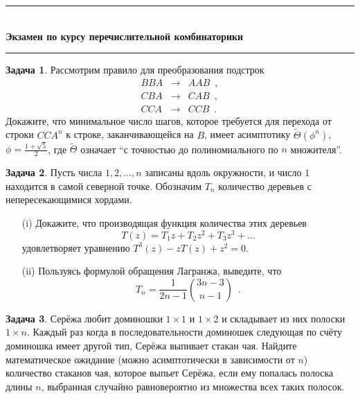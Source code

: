 \documentclass[a5paper]{article}
\def \topic {Экзамен по курсу перечислительной комбинаторики}
\theoremstyle{definition}
\newtheorem{problem}{Задача}
\newcommand{\HRule}{\rule{\linewidth}{0.5mm}}
\begin{document}
\begin{center}

\vspace{-2cm}
\HRule \\[0.2cm]
{ \Large \bfseries \topic} %
\HRule

\end{center}

\begin{center}
\end{center}

\begin{problem}
    Рассмотрим правило для преобразования подстрок
\begin{eqnarray*}
    BBA &\to& AAB \enspace , \\
    CBA &\to& CAB \enspace , \\
    CCA &\to& CCB \enspace . 
\end{eqnarray*}
Докажите, что минимальное число шагов, которое требуется для перехода от строки
\( CC A^{n} \) к строке, заканчивающейся на \( B \), имеет
асимптотику \( \widetilde\Theta(\phi^n) \), \( \phi = \frac{1 + \sqrt{5}}{2} \),
где \( \widetilde \Theta \) означает ``с точностью до полиномиального по \( n \)
множителя''.
\end{problem}

\begin{problem}
    Пусть числа \( 1, 2, \ldots, n \) записаны вдоль окружности,
и число \( 1 \) находится в самой северной точке.
Обозначим \( T_n \) количество деревьев с непересекающимися хордами.
\begin{enumerate}
\item[(i)] Докажите, что производящая функция количества этих деревьев
\begin{equation}
    T(z) = T_1 z + T_2 z^2 + T_3z^3 + \ldots
\end{equation}
удовлетворяет уравнению
\(
    T^3(z) - z T(z) + z^2 = 0
\).
\item[(ii)] Пользуясь формулой обращения Лагранжа, выведите, что
\begin{equation}
    T_n = \dfrac{1}{2n - 1} {3n - 3 \choose n-1}
    \enspace .
\end{equation}
\end{enumerate}
\end{problem}

\newpage
\begin{problem}
    Серёжа любит доминошки \( 1 \times 1 \) и \( 1 \times 2 \) и складывает
из них полоски \( 1 \times n \). Каждый раз когда в последовательности доминошек
следующая по счёту доминошка имеет другой тип, Серёжа выпивает стакан чая.
Найдите математическое ожидание (можно асимптотически в зависимости от \( n \))
количество стаканов чая, которое выпьет Серёжа, если ему попалась полоска длины
\( n \), выбранная случайно равновероятно из множества всех таких полосок. 
\end{problem}
\end{document}
